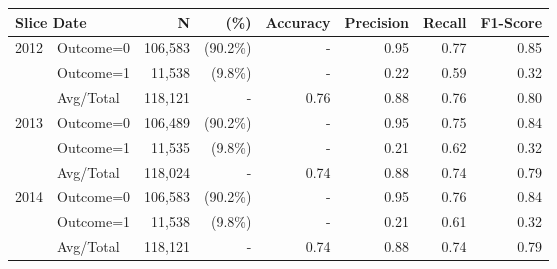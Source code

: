 \begin{tabular}{llrrrrrr} \toprule
\multicolumn{2}{l}{Slice Date} & N & (\%)    & Accuracy & Precision   & Recall & F1-Score \\ \midrule
2012 & Outcome=0 & 106,583 & (90.2\%) & - & 0.95 & 0.77 & 0.85 \\
     & Outcome=1 & 11,538 & (9.8\%) & - & 0.22 & 0.59 & 0.32 \\
     & Avg/Total & 118,121 & - & 0.76 & 0.88 & 0.76 & 0.80 \\
2013 & Outcome=0 & 106,489 & (90.2\%) & - & 0.95 & 0.75 & 0.84 \\
     & Outcome=1 & 11,535 & (9.8\%) & - & 0.21 & 0.62 & 0.32 \\
     & Avg/Total & 118,024 & - & 0.74 & 0.88 & 0.74 & 0.79 \\
2014 & Outcome=0 & 106,583 & (90.2\%) & - & 0.95 & 0.76 & 0.84 \\
     & Outcome=1 & 11,538 & (9.8\%) & - & 0.21 & 0.61 & 0.32 \\
     & Avg/Total & 118,121 & - & 0.74 & 0.88 & 0.74 & 0.79 \\
\bottomrule \end{tabular}
